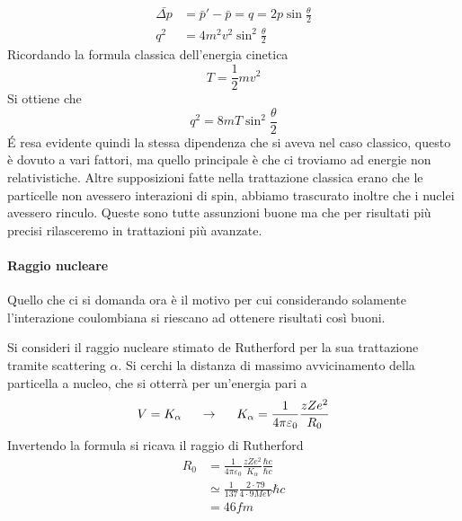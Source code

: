 \begin{equation}
\begin{split}
\bar{\Delta p} &=\bar p'-\bar p=q=2p \sin\frac{\theta}{2}\\
q^2 &=4m^2v^2\sin^2 \frac{\theta}{2}
\end{split}
\end{equation}
Ricordando la formula classica dell'energia cinetica
\begin{equation}
T =\frac{1}{2}mv^2
\end{equation}
Si ottiene che 
\begin{equation}
q^2=8mT\sin^2\frac{\theta}{2}
\end{equation}
\'E resa evidente quindi la stessa dipendenza che si aveva nel caso classico, questo è dovuto a vari fattori, ma quello principale è che ci troviamo ad energie non relativistiche.
Altre supposizioni fatte nella trattazione classica erano che le particelle non avessero interazioni di spin, abbiamo trascurato inoltre che i nuclei avessero rinculo. 
Queste sono tutte assunzioni buone ma che per risultati più precisi rilasceremo in trattazioni più avanzate.

\paragraph{Raggio nucleare} Quello che ci si domanda ora è il motivo per cui considerando solamente l'interazione coulombiana si riescano ad ottenere risultati così buoni.

Si consideri il raggio nucleare stimato de Rutherford per la sua trattazione tramite scattering $\alpha$. 
Si cerchi la distanza di massimo avvicinamento della particella a nucleo, che si otterrà per un'energia pari a 
\begin{equation}
V=K_\alpha \hspace{0.5cm}\to \hspace{0.5cm}K_{\alpha}=\frac{1}{4\pi\varepsilon_0}\frac{zZe^2}{R_0}
\end{equation}
Invertendo la formula si ricava il raggio di Rutherford
\begin{equation}
\begin{split}
R_0 &=\frac{1}{4\pi\varepsilon_0}\frac{zZe^2}{K_{\alpha}}\frac{\hbar c}{\hbar c}\\
&\simeq\frac{1}{137}\frac{2\cdot 79}{4\cdot 9 MeV}\hbar c\\
&=46 fm
\end{split}
\end{equation}

